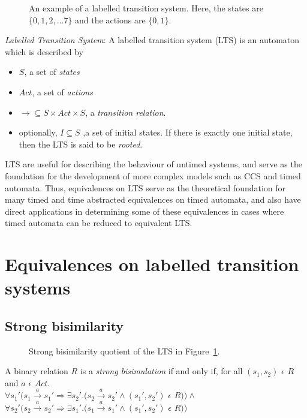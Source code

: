 \documentclass[a4paper]{llncs}
\begin{document}
\begin{SCfigure}
  \centering
  \def\svgwidth{0.3\columnwidth}
  
  \caption{An example of a labelled transition system. Here, the
    states are $\{0, 1, 2, \ldots 7\}$ and the actions are $\{0,
    1\}$.}
  \label{lts01}
\end{SCfigure}

\begin{definition}
  \emph{Labelled Transition System}: A labelled transition system (LTS)
  \cite{Keller:1976:FVP:360248.360251} is an automaton which is
  described by
  \begin{itemize}
  \item $S$, a set of \emph{states} 
  \item $Act$, a set of \emph{actions}
  \item $\rightarrow \subseteq S \times Act \times S$, a \emph{transition
    relation}.
  \item optionally, $I \subseteq S$ ,a set of initial states. If there
    is exactly one initial state, then the LTS is said to be \emph{rooted}.
  \end{itemize}
\end{definition}

LTS are useful for describing the behaviour of untimed systems, and
serve as the foundation for the development of more complex models
such as CCS and timed automata. Thus, equivalences on LTS serve
as the theoretical foundation for many timed and time abstracted
equivalences on timed automata, and also have direct applications in
determining some of these equivalences in cases where timed automata
can be reduced to equivalent LTS.

\section{Equivalences on labelled transition systems}

\subsection{Strong bisimilarity}

\begin{SCfigure}
  \centering
  \def\svgwidth{0.5\columnwidth}
  
  \caption{Strong bisimilarity quotient of the LTS in Figure~\ref{lts01}.}
\end{SCfigure}

A binary relation $R$ is a \textit{strong
  bisimulation} if and only if, for all $(s_1, s_2)$ $\epsilon$ $R$ and $a$ $\epsilon$ $Act .$\\
$\forall s_1' (s_1 \xrightarrow{a} s_1' \Rightarrow \exists s_2'
. (s_2 \xrightarrow{a} s_2' \wedge (s_1', s_2')$ $\epsilon$ $R ) )
\wedge $ \\
$\forall s_2' (s_2 \xrightarrow{a} s_2' \Rightarrow \exists s_1'
. (s_1 \xrightarrow{a} s_1' \wedge (s_1', s_2')$ $\epsilon$ $R ) )$
\end{document}
